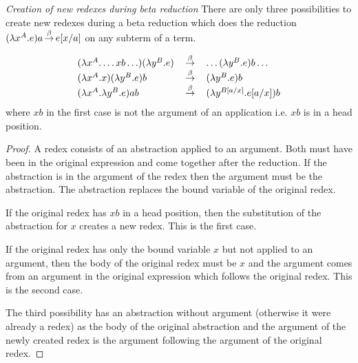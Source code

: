 \begin{theorem}
    \label{thm:NewRedexCreation}
    \emph{Creation of new redexes during beta reduction} There are only three
    possibilities to create new redexes during a beta reduction which does the
    reduction $(\lambda x^A.e) a \reduce \sub a x e$ on any subterm of a term.

    $$
    \begin{array}{lll}
        (\lambda x^A. \ldots xb \ldots) (\lambda y^B. e)
        &\reduce&
        \ldots (\lambda y^B.e) b \ldots
        \\
        (\lambda x^A. x)(\lambda y^B. e) b
        &\reduce&
        (\lambda y^B. e) b
        \\
        (\lambda x^A . \lambda y^B. e) a b
        &\reduce&
        (\lambda y^{B[a/x]}. e[a/x]) b
    \end{array}
    $$
    where $xb$ in the first case is not the argument of an application i.e. $xb$
    is in a head position.

    \begin{proof}
        A redex consists of an abstraction applied to an argument. Both must
        have been in the original expression and come together after the
        reduction. If the abstraction is in the argument of the redex then the
        argument must be the abstraction. The abstraction replaces the bound
        variable of the original redex.

        If the original redex has $x b$ in a head position, then the
        substitution of the abstraction for $x$ creates a new redex. This is the
        first case.

        If the original redex has only the bound variable $x$ but not applied to
        an argument, then the body of the original redex must be $x$ and the
        argument comes from an argument in the original expression which follows
        the original redex. This is the second case.

        The third possibility has an abstraction without argument (otherwise it
        were already a redex) as the body of the original abstraction and the
        argument of the newly created redex is the argument following the
        argument of the original redex.
    \end{proof}
\end{theorem}



